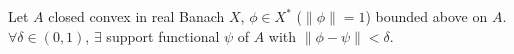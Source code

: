 Let $A$ closed convex in real Banach $X$, $\phi\in X^*$ ($\|\phi\|=1$) bounded above on $A$. $\forall\delta\in(0,1)$, $\exists$ support functional $\psi$ of $A$ with $\|\phi-\psi\|<\delta$.
